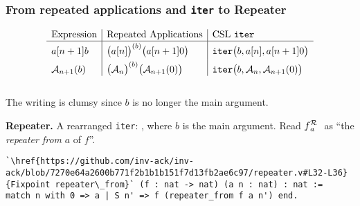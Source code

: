 \begin{frame}[fragile]
\frametitle{From repeated applications and \texttt{iter} to Repeater}
%
%
%


\vspace{-2ex}
\begin{equation*}
\begin{array}{l|l|l}
\text{Expression} & \text{Repeated Applications} & \text{CSL } \texttt{iter} \\ \hline
a[n+1]b & \big(a[n]\big)^{(b)}\big(a[n+1]0\big) & \texttt{iter}\big(b, a[n], a[n+1]0\big) \topspace{2pt} \botspace{2pt} \\
\Ack_{n+1}(b) & \big(\Ack_n\big)^{(b)}\big(\Ack_{n+1}(0)\big) & \texttt{iter}\big(b, \Ack_n, \Ack_{n+1}(0)\big) \topspace{2pt}
\end{array}
\end{equation*}
\\ \vspace{-0.5ex}
The writing is clumsy since $b$ is no longer the main argument.

\smallskip

\pause 
\textbf{Repeater.} A rearranged \texttt{iter}:
, where $b$ is the main argument. \pause Read $\rf{f}{a}$ \ as ``the \emph{repeater from} $a$ of $f$''.



\pause
\begin{lstlisting}
`\href{https://github.com/inv-ack/inv-ack/blob/7270e64a2600b771f2b1b1b151f7d13fb2ae6c97/repeater.v#L32-L36}{Fixpoint repeater\_from}` (f : nat -> nat) (a n : nat) : nat :=
match n with 0 => a | S n' => f (repeater_from f a n') end.
\end{lstlisting}


\end{frame}
